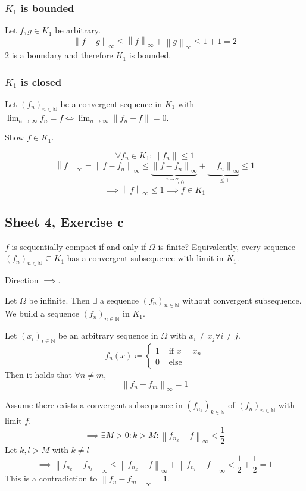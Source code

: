 \documentclass{article}
\newcommand{\norm}[1]{\left\|#1\right\|}
\begin{document}
\subsubsection{$K_1$ is bounded}
Let $f,g \in K_1$ be arbitrary.
\[ \norm{f - g}_{\infty} \leq \norm{f}_{\infty} + \norm{g}_{\infty} \leq 1 + 1 = 2 \]
$2$ is a boundary and therefore $K_1$ is bounded.

\subsubsection{$K_1$ is closed}
Let $(f_n)_{n \in \mathbb N}$ be a convergent sequence in $K_1$
with $\lim_{n\to\infty} f_n = f \iff \lim_{n\to\infty} \norm{f_n - f} = 0$.

Show $f \in K_1$.

\[ \forall f_n \in K_1: \norm{f_n} \leq 1 \]
\[ \norm{f}_{\infty} = \norm{f - f_n}_{\infty} \leq \underbrace{\norm{f - f_n}_{\infty}}_{\xrightarrow{n \to \infty} 0} + \underbrace{\norm{f_n}_{\infty}}_{\leq 1} \leq 1 \]
\[ \implies \norm{f}_{\infty} \leq 1 \implies f \in K_1 \]

\subsection{Sheet 4, Exercise c}
$f$ is sequentially compact if and only if $\Omega$ is finite?
Equivalently, every sequence $(f_n)_{n \in \mathbb N} \subseteq K_1$ has a convergent subsequence with limit in $K_1$.

Direction $\implies$.

Let $\Omega$ be infinite. Then $\exists$ a sequence $(f_n)_{n \in \mathbb N}$ without convergent subsequence.
We build a sequence $(f_n)_{n \in \mathbb N}$ in $K_1$.

Let $(x_i)_{i \in \mathbb N}$ be an arbitrary sequence in $\Omega$ with $x_i \neq x_j \forall i \neq j$.
\[
  f_n(x) \coloneqq \begin{cases}
    1 & \text{ if } x = x_n \\
    0 & \text{ else}
  \end{cases}
\]
Then it holds that $\forall n \neq m$,
\[ \norm{f_n - f_m}_{\infty} = 1 \]

Assume there exists a convergent subsequence in $(f_{n_k})_{k \in \mathbb N}$ of $(f_n)_{n \in \mathbb N}$ with limit $f$.
\[ \implies \exists M > 0: k > M: \norm{f_{n_k} - f}_{\infty} < \frac12 \]
Let $k,l > M$ with $k \neq l$
\[ \implies \norm{f_{n_k} - f_{n_l}}_{\infty} \leq \norm{f_{n_k} - f}_{\infty} + \norm{f_{n_l} - f}_{\infty} < \frac12 + \frac12 = 1 \]
This is a contradiction to $\norm{f_n - f_m}_{\infty} = 1$.
\end{document}
